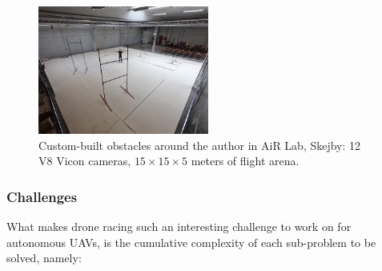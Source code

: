 \begin{figure}[h]
	\centering
	\includegraphics[width=0.5\textwidth]{figure/tiny_me.jpg}
	\caption[Custom-built obstacles around the author in AiR Lab]{Custom-built
		obstacles around the author in AiR Lab, Skejby: 12 V8 Vicon cameras,
		$15 \times 15 \times 5$ meters of flight arena.}
	\label{fig:mygates}
\end{figure}

\subsubsection{Challenges}

What makes drone racing such an interesting challenge to work on for autonomous
UAVs, is the cumulative complexity of each sub-problem to be solved, namely:

